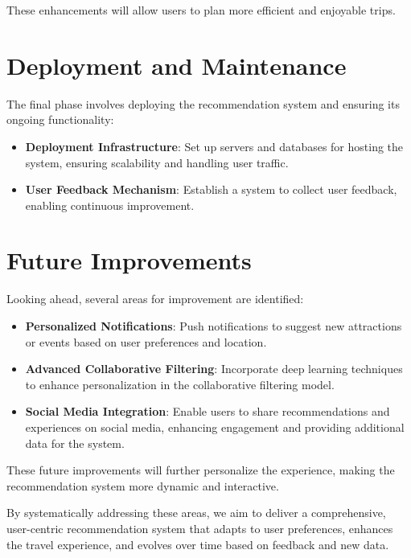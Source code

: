 These enhancements will allow users to plan more efficient and enjoyable trips.

\section{Deployment and Maintenance}
The final phase involves deploying the recommendation system and ensuring its ongoing functionality:

\begin{itemize}
    \item \textbf{Deployment Infrastructure}: Set up servers and databases for hosting the system, ensuring scalability and handling user traffic.
    \item \textbf{User Feedback Mechanism}: Establish a system to collect user feedback, enabling continuous improvement.
\end{itemize}

\section{Future Improvements}
Looking ahead, several areas for improvement are identified:

\begin{itemize}
    \item \textbf{Personalized Notifications}: Push notifications to suggest new attractions or events based on user preferences and location.
    \item \textbf{Advanced Collaborative Filtering}: Incorporate deep learning techniques to enhance personalization in the collaborative filtering model.
    \item \textbf{Social Media Integration}: Enable users to share recommendations and experiences on social media, enhancing engagement and providing additional data for the system.
\end{itemize}

These future improvements will further personalize the experience, making the recommendation system more dynamic and interactive.

By systematically addressing these areas, we aim to deliver a comprehensive, user-centric recommendation system that adapts to user preferences, enhances the travel experience, and evolves over time based on feedback and new data.
